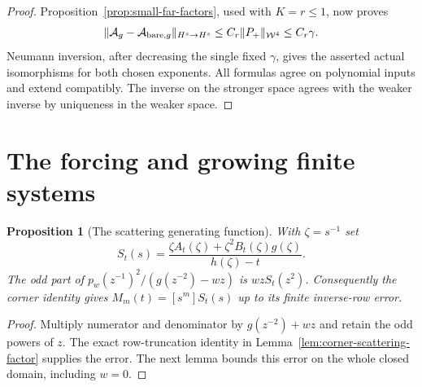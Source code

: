 \documentclass[11pt]{article}
\newtheorem{proposition}{Proposition}[section]
\begin{document}
\begin{proof}
Proposition~\ref{prop:small-far-factors}, used with $K=r\le1$,
now proves
\[
 \|\mathcal A_g-\mathcal A_{{\rm bare},g}\|_{H^s\to H^s}
       \le C_r\|P_+\|_{\mathcal W^4}\le C_r\gamma .
\]
Neumann inversion, after decreasing the single fixed $\gamma$,
gives the asserted actual isomorphisms for both chosen exponents.
All formulas agree on polynomial inputs and extend compatibly.
The inverse on the stronger space agrees with the weaker inverse
by uniqueness in the weaker space.
\end{proof}


\section{The forcing and growing finite systems}
\begin{proposition}[The scattering generating function]
\label{prop:fixed-background-forcing}
With $\zeta=s^{-1}$ set
\[
 S_t(s)=\frac{\zeta A_t(\zeta)+\zeta^2B_t(\zeta)g(\zeta)}
                  {h(\zeta)-t}.
\]
The odd part of $p_w(z^{-1})^2/(g(z^{-2})-wz)$ is
$wzS_t(z^2)$. Consequently the corner identity gives
$M_m(t)=[s^m]S_t(s)$ up to its finite inverse-row error.
\end{proposition}
\begin{proof}
Multiply numerator and denominator by $g(z^{-2})+wz$ and
retain the odd powers of $z$. The exact row-truncation identity
in Lemma~\ref{lem:corner-scattering-factor} supplies the error.
The next lemma bounds this error on the whole closed domain,
including $w=0$.
\end{proof}
\end{document}
